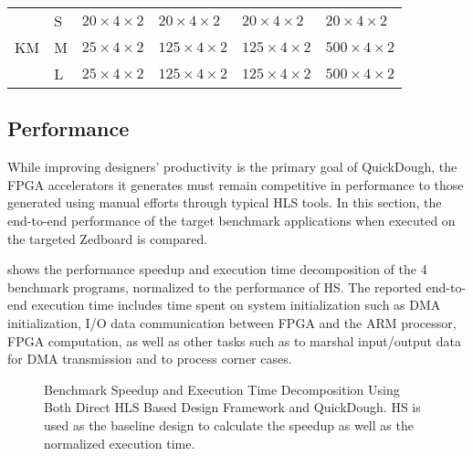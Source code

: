 \begin{table}
{{\begin{tabular}{l|l|l|l|l|l}
\multirow{3}{*}{KM} & S & $20 \times 4 \times 2$ & $20 \times 4 \times 2$ & $20 \times 4
\times 2$ & $20 \times 4 \times 2$  \\ \cline{2-6} 
                 & M & $25 \times 4 \times 2$ & $125 \times 4 \times 2$ & $125 \times 4 \times 2$ &
$500 \times 4 \times 2$  \\ \cline{2-6} 
                 & L & $25 \times 4 \times 2$ & $125 \times 4 \times 2$ & $125 \times 4 \times 2$  & $500 \times 4 \times 2$   \\ \hline
\end{tabular}
}
}
\end{table}
 
\subsection{Performance} \label{subsec:performance}
While improving designers' productivity is the primary goal of QuickDough, the FPGA accelerators it
generates must remain competitive in performance to those generated using manual efforts through
typical HLS tools.  In this section, the end-to-end performance of the target benchmark applications
when executed on the targeted Zedboard is compared.

 shows the performance speedup and execution time decomposition of the 4
benchmark programs, normalized to the performance of HS. The reported end-to-end execution
time includes time spent on system initialization such as DMA initialization, I/O data communication
between FPGA and the ARM processor, FPGA computation, as well as other tasks such as to marshal
input/output data for DMA transmission and to process corner cases.

\begin{figure}
\centering
{}
\qquad
{}
\qquad
{}
\qquad
{}
\caption{Benchmark Speedup and Execution Time Decomposition Using Both Direct HLS Based Design
Framework and QuickDough. HS is used as the baseline design to calculate the speedup as well as the
normalized execution time.}
\label{fig:real-perf}
\end{figure}

